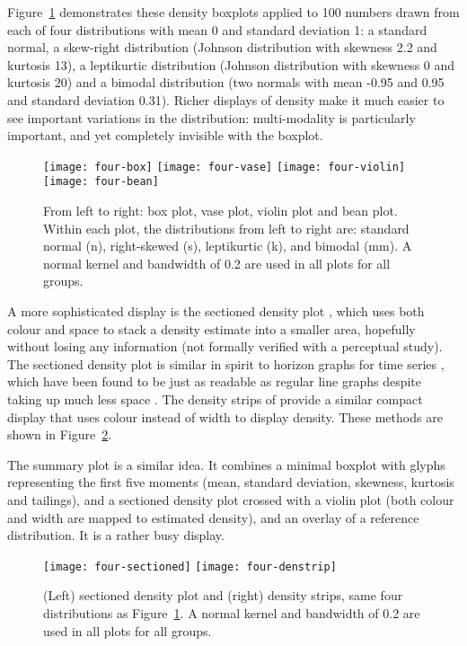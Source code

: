 \documentclass[oneside]{article}
\begin{document}
Figure~\ref{fig:density} demonstrates these density boxplots applied to 100 numbers drawn from each of four distributions with mean 0 and standard deviation 1: a standard normal, a skew-right distribution (Johnson distribution with skewness 2.2 and kurtosis 13), a leptikurtic distribution (Johnson distribution with skewness 0 and kurtosis 20) and a bimodal distribution (two normals with mean -0.95 and 0.95 and standard deviation 0.31). Richer displays of density make it much easier to see important variations in the distribution: multi-modality is particularly important, and yet completely invisible with the boxplot.

\begin{figure}[htbp]
  \centering
  \texttt{[image: four-box]}%
  \texttt{[image: four-vase]}%
  \texttt{[image: four-violin]}%
  \texttt{[image: four-bean]}
  \caption{From left to right: box plot, vase plot, violin plot and bean plot.  
Within each plot, the distributions from left to right are: standard normal (n), right-skewed (s), leptikurtic (k), and bimodal (mm). A normal kernel and bandwidth of 0.2 are used in all plots for all groups.}
  \label{fig:density}
\end{figure}

A more sophisticated display is the sectioned density plot \citep{cohen:2006}, which uses both colour and space to stack a density estimate into a smaller area, hopefully without losing any information (not formally verified with a perceptual study). The sectioned density plot is similar in spirit to horizon graphs for time series \citep{reijner:2008}, which have been found to be just as readable as regular line graphs despite taking up much less space \citep{heer:2009}. The density strips of \citet{jackson:2008} provide a similar compact display that uses colour instead of width to display density. These methods are shown in Figure~\ref{fig:density-display}. 

The summary plot \citep{potter:2010} is a similar idea. It combines a minimal boxplot with glyphs representing the first five moments (mean, standard deviation, skewness, kurtosis and tailings), and a sectioned density plot crossed with a violin plot (both colour and width are mapped to estimated density), and an overlay of a reference distribution. It is a rather busy display.

\begin{figure}[htbp]
  \centering
  \texttt{[image: four-sectioned]}%
  \texttt{[image: four-denstrip]}
  \caption{(Left) sectioned density plot and (right) density strips, same four distributions as Figure~\ref{fig:density}. A normal kernel and bandwidth of 0.2 are used in all plots for all groups.}
  \label{fig:density-display}
\end{figure}
\end{document}
